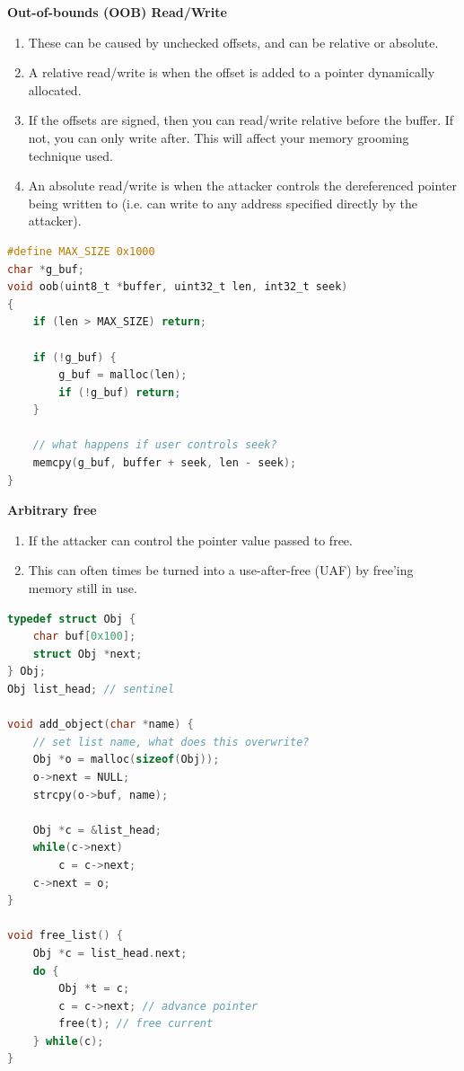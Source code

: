 \documentclass[12pt]{Training}
\begin{document}
\textbf{Out-of-bounds (OOB) Read/Write}
\begin{enumerate}
    \item These can be caused by unchecked offsets, and can be relative or absolute.
    \item A relative read/write is when the offset is added to a pointer dynamically allocated.
   \item  If the offsets are signed, then you can read/write relative before the buffer. If not, you can only write after. This will affect your memory grooming technique used.
    \item An absolute read/write is when the attacker controls the dereferenced pointer being written to (i.e. can write to any address specified directly by the attacker).
\end{enumerate}
\begin{sectionbox}
\begin{lstlisting}[language=C, caption={Out-of-bound Read}]
#define MAX_SIZE 0x1000
char *g_buf;
void oob(uint8_t *buffer, uint32_t len, int32_t seek)
{
    if (len > MAX_SIZE) return;

    if (!g_buf) {
        g_buf = malloc(len);
        if (!g_buf) return;
    }

    // what happens if user controls seek?
    memcpy(g_buf, buffer + seek, len - seek);
}
\end{lstlisting}
\end{sectionbox}

\textbf{Arbitrary free}
\begin{enumerate}
    \item If the attacker can control the pointer value passed to free.
    \item This can often times be turned into a use-after-free (UAF) by free'ing memory still in use.
\end{enumerate}
\begin{sectionbox}
\begin{lstlisting}[language=C, caption={Arbitrary Free}]
typedef struct Obj {
    char buf[0x100];
    struct Obj *next;
} Obj;
Obj list_head; // sentinel

void add_object(char *name) {
    // set list name, what does this overwrite?
    Obj *o = malloc(sizeof(Obj));
    o->next = NULL;
    strcpy(o->buf, name);

    Obj *c = &list_head;
    while(c->next)
        c = c->next;
    c->next = o;
}

void free_list() {
    Obj *c = list_head.next;
    do {
        Obj *t = c;
        c = c->next; // advance pointer
        free(t); // free current
    } while(c);
}
\end{lstlisting}
\end{sectionbox}
\end{document}
